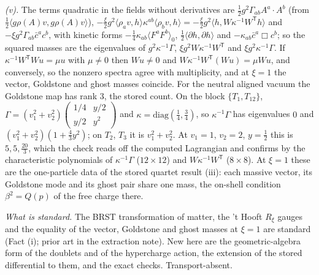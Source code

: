 \emph{(v).} The terms quadratic in the fields without derivatives are $\tfrac12g^{2}\Gamma_{ab}A^{a}\cdot A^{b}$ (from $\tfrac12\langle g\rho(A)v, g\rho(A)v\rangle$), $-\tfrac{\xi}{2}g^{2}\langle\rho_{a}v, h\rangle\kappa^{ab}\langle\rho_{b}v, h\rangle = -\tfrac{\xi}{2}g^{2}\langle h, W\kappa^{-1}W^{\mathsf T}h\rangle$ and $-\xi g^{2}\Gamma_{ab}\bar c^{a}c^{b}$, with kinetic forms $-\tfrac14\kappa_{ab}\langle F^{a}F^{b}\rangle_{0}$, $\tfrac12\langle\partial h, \partial h\rangle$ and $-\kappa_{ab}\bar c^{a}\Box c^{b}$; so the squared masses are the eigenvalues of $g^{2}\kappa^{-1}\Gamma$, $\xi g^{2}W\kappa^{-1}W^{\mathsf T}$ and $\xi g^{2}\kappa^{-1}\Gamma$. If $\kappa^{-1}W^{\mathsf T}Wu = \mu u$ with $\mu \ne 0$ then $Wu \ne 0$ and $W\kappa^{-1}W^{\mathsf T}(Wu) = \mu Wu$, and conversely, so the nonzero spectra agree with multiplicity, and at $\xi = 1$ the vector, Goldstone and ghost masses coincide. For the neutral aligned vacuum the Goldstone map has rank $3$, the stored count. On the block $\{T_{1}, T_{12}\}$, $\Gamma = (v_{1}^{2} + v_{2}^{2})\left(\begin{smallmatrix}1/4 & y/2\\ y/2 & y^{2}\end{smallmatrix}\right)$ and $\kappa = \mathrm{diag}(\tfrac14, \tfrac34)$, so $\kappa^{-1}\Gamma$ has eigenvalues $0$ and $(v_{1}^{2} + v_{2}^{2})(1 + \tfrac43y^{2})$; on $T_{2}$, $T_{3}$ it is $v_{1}^{2} + v_{2}^{2}$. At $v_{1} = 1$, $v_{2} = 2$, $y = \tfrac12$ this is $5, 5, \tfrac{20}{3}$, which the check reads off the computed Lagrangian and confirms by the characteristic polynomials of $\kappa^{-1}\Gamma$ ($12 \times 12$) and $W\kappa^{-1}W^{\mathsf T}$ ($8 \times 8$). At $\xi = 1$ these are the one-particle data of the stored quartet result (iii): each massive vector, its Goldstone mode and its ghost pair share one mass, the on-shell condition $\beta^{2} = Q(p)$ of the free charge there.

\emph{What is standard.} The BRST transformation of matter, the 't Hooft $R_{\xi}$ gauges and the equality of the vector, Goldstone and ghost masses at $\xi = 1$ are standard (Fact (i); prior art in the extraction note). New here are the geometric-algebra form of the doublets and of the hypercharge action, the extension of the stored differential to them, and the exact checks. Transport-absent.
